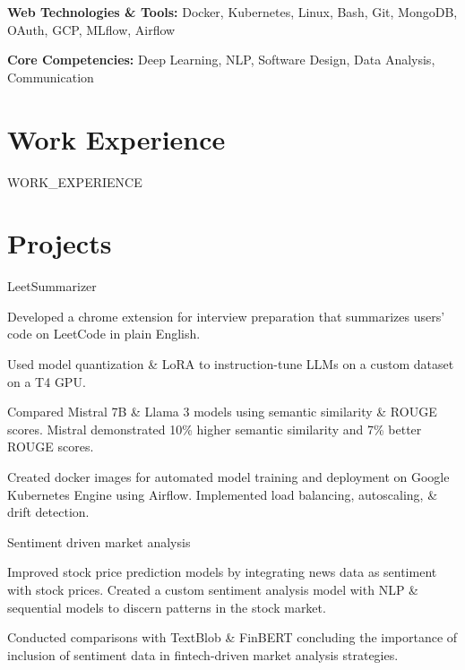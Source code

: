 \documentclass[letterpaper]{resume_config}
\begin{document}
\noindent
\textbf{Web Technologies \& Tools:} Docker, Kubernetes, Linux, Bash, Git, MongoDB, OAuth, GCP, MLflow, Airflow

\noindent
\textbf{Core Competencies:} Deep Learning, NLP, Software Design, Data Analysis, Communication

\vspace{-7pt}



\section{Work Experience}
{WORK_EXPERIENCE}


\section{Projects}
\vspace{-1pt}
\WorkExperience
    {LeetSummarizer}%
    {} %
    {} %
    {\vspace{-13pt}} %
    {
        \item Developed a chrome extension for interview preparation that summarizes users' code on LeetCode in plain English.
        \item Used model quantization \& LoRA to instruction-tune LLMs on a custom dataset on a T4 GPU.
        \item Compared Mistral 7B \& Llama 3 models using semantic similarity \& ROUGE scores. Mistral demonstrated 10\% higher semantic similarity and 7\% better ROUGE scores.
        \item Created docker images for automated model training and deployment on Google Kubernetes Engine using Airflow. Implemented load balancing, autoscaling, \& drift detection.
    }

\vspace{1pt}

\WorkExperience
    {Sentiment driven market analysis}%
    {} %
    {} %
    {\vspace{-13pt}} %
    {
        \item Improved stock price prediction models by integrating news data as sentiment with stock prices. Created a custom sentiment analysis model with NLP \& sequential models to discern patterns in the stock market.
        \item Conducted comparisons with TextBlob \& FinBERT concluding the importance of inclusion of sentiment data in fintech-driven market analysis strategies.
    }
\end{document}
